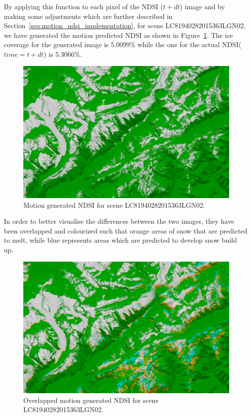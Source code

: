 \documentclass[12pt, a4paper]{report}
\begin{document}
	\par By applying this function to each pixel of the NDSI (\(t + dt\)) image and by making some adjustments which are further described in Section~\ref{seq:motion_ndsi_implementation}, for scene LC81940282015363LGN02, we have generated the motion predicted NDSI as shown in Figure~\ref{fig:motion_predicted_image}. The ice coverage for the generated image is 5.0099\% while the one for the actual NDSI(\(time=t+dt\)) is 5.3066\%.
	
	\begin{figure}[h!]
	\centering
	\includegraphics[width=\linewidth]{../images/LC81940282015363LGN02_motion_predicted.png}
	\caption{Motion generated NDSI for scene LC81940282015363LGN02.}
	\label{fig:motion_predicted_image}
	\end{figure}

	In order to better visualise the differences between the two images, they have been overlapped and colourized such that orange areas of snow that are predicted to melt, while blue represents areas which are predicted to develop snow build up.
	
	\begin{figure}[h!]
		\centering
		\includegraphics[width=\linewidth]{../images/LC81940282015363LGN02_motion_predicted_overlay.png}
		\caption{Overlapped motion generated NDSI for scene LC81940282015363LGN02.}
		\label{fig:overlapped_motion_predicted_image}
	\end{figure}
\end{document}
